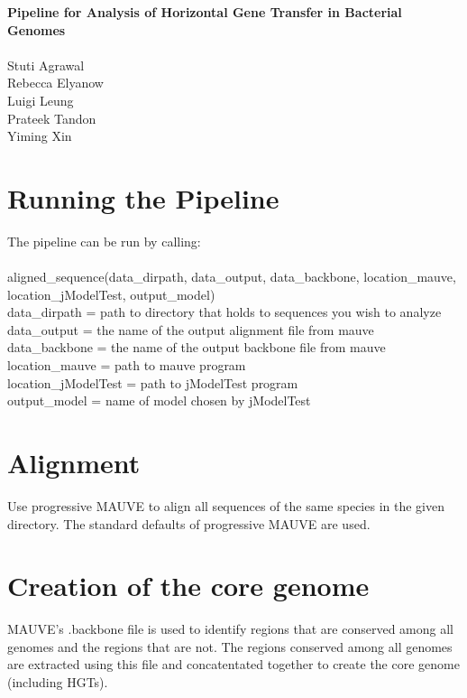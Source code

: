\documentclass[11pt]{article}
\begin{document}
\begin{center}
\textbf{\LARGE{Pipeline for Analysis of Horizontal Gene Transfer in Bacterial Genomes}}\\
~~~\\
\Large{Stuti Agrawal}\\
\Large{Rebecca Elyanow}\\
\Large{Luigi Leung}\\
\Large{Prateek Tandon}\\
\Large{Yiming Xin}
\end{center}
\tableofcontents



\section{Running the Pipeline}
The pipeline can be run by calling:\\
\\
aligned\_sequence(data\_dirpath, data\_output, data\_backbone, location\_mauve, location\_jModelTest, output\_model)\\

data\_dirpath = path to directory that holds to sequences you wish to analyze\\
data\_output = the name of the output alignment file from mauve\\
data\_backbone = the name of the output backbone file from mauve\\
location\_mauve = path to mauve program\\
location\_jModelTest = path to jModelTest program\\
output\_model = name of model chosen by jModelTest\\

\section{Alignment}
Use progressive MAUVE \cite{mauve} to align all sequences of the same species in the given directory. The standard defaults of progressive MAUVE are used.\\

\section{Creation of the core genome}
MAUVE’s .backbone file is used to identify regions that are conserved among all genomes and the regions that are not. The regions conserved among all genomes are extracted using this file and concatentated together to create the core genome (including HGTs). \\
\end{document}
